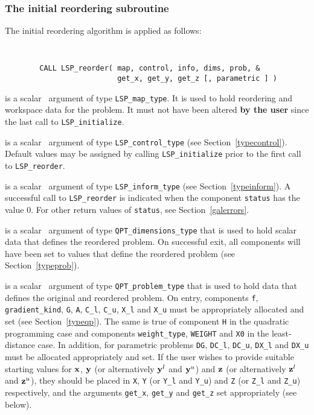 \documentclass{galahad}
\newcommand{\packagename}{LSP}
\begin{document}
\subsubsection{The initial reordering subroutine}
The initial reordering algorithm is applied as follows: 
\vspace*{-2mm}
{\tt 
\begin{verbatim}
        CALL LSP_reorder( map, control, info, dims, prob, &
                          get_x, get_y, get_z [, parametric ] )
\end{verbatim}
}
\vspace*{-4mm}
\begin{description}
 is a scalar \intentinout\ argument of type 
{\tt \packagename\_map\_type}. 
It is used to hold reordering and workspace data for the problem. 
It must not have been altered {\bf by the user} since the last call
to {\tt \packagename\_initialize}. 
 
 is a scalar \intentin\ argument of type 
{\tt \packagename\_control\_type} 
(see Section~\ref{typecontrol}). 
Default values may be assigned by calling 
{\tt \packagename\_initialize} 
prior to the first call to {\tt \packagename\_reorder}. 
 
 is a scalar \intentout\ argument of type 
{\tt \packagename\_inform\_type} 
(see Section~\ref{typeinform}). 
A successful call to {\tt \packagename\_reor\-der} is indicated 
when the component {\tt status} has the value 0. For other return values 
of {\tt status}, see Section~\ref{galerrors}. 
 
 is a scalar \intentout\ argument of type 
{\tt QPT\_dimensions\_type} that 
is used to hold scalar data that defines the reordered problem. 
On successful exit, all components will have been set to values 
that define the reordered problem (see Section~\ref{typeprob}). 
 
 is a scalar \intentinout\ argument of type 
{\tt QPT\_problem\_type} that 
is used to hold data that defines the original and reordered problem. 
On entry, components {\tt f}, {\tt gradient\_kind}, {\tt G},
{\tt A}, {\tt C\_l}, {\tt C\_u}, {\tt X\_l} and {\tt X\_u} 
must be appropriately allocated and set (see Section~\ref{typeqp}).
The same is true of component {\tt H} in the quadratic programming case
and components {\tt weight\_type}, {\tt WEIGHT} and {\tt X0} 
in the least-distance case. 
In addition, for parametric problems
{\tt DG}, {\tt DC\_l}, {\tt DC\_u}, {\tt DX\_l} and {\tt DX\_u}
must be allocated appropriately and set.
If the user wishes to provide suitable starting values for ${\mathbf{x}}$, ${\mathbf{y}}$ 
(or alternatively ${\mathbf{y}}^l$ and ${\mathbf{y}}^u$) and
${\mathbf{z}}$ (or alternatively ${\mathbf{z}}^l$ and ${\mathbf{z}}^u$), 
they should be placed in {\tt X}, {\tt Y} (or {\tt Y\_l} and {\tt Y\_u})
and {\tt Z} (or {\tt Z\_l} and {\tt Z\_u}) respectively,
and the arguments {\tt get\_x}, {\tt get\_y} and {\tt get\_z}
set appropriately (see below). 


\end{description}
\end{document}
